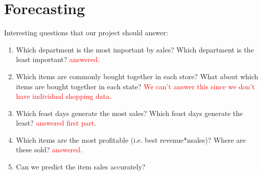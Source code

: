 \documentclass[12pt]{article}
\begin{document}
\clearpage
\section{Forecasting}

Interesting questions that our project should answer:
\begin{enumerate}
    \item Which department is the most important by sales? Which department is the least important?  \textcolor{red}{answered.}
    \item Which items are commonly bought together in each store? What about which items are bought together in each state? \textcolor{red}{We can't answer this since we don't have individual shopping data.}
    \item Which feast days generate the most sales? Which feast days generate the least? \textcolor{red}{answered first part.}
    \item Which items are the most profitable (i.e. best revenue*nsales)? Where are these sold? \textcolor{red}{answered.}
    \item Can we predict the item sales accurately?
\end{enumerate}
\end{document}
